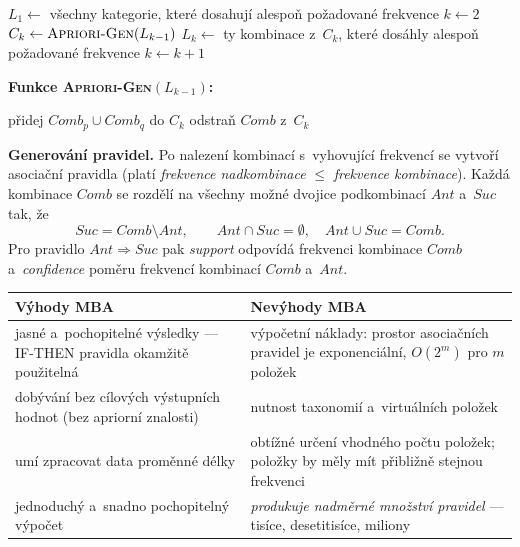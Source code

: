 \documentclass[11pt,a4paper]{article}
\theoremstyle{definition}
\begin{document}
\begin{defbox}
\begin{algorithmic}[1]
\State $L_1\gets$ všechny kategorie, které dosahují alespoň požadované frekvence
\State $k\gets 2$
  \State $C_k\gets \textsc{Apriori-Gen}(L_{k-1})$ 
  \State $L_k\gets$ ty kombinace z~$C_k$, které dosáhly alespoň požadované frekvence
  \State $k\gets k+1$
\EndWhile
\end{algorithmic}

\textbf{Funkce \textsc{Apriori-Gen}$(L_{k-1})$:}
\begin{algorithmic}[1]
     \State přidej $\mathit{Comb}_p\cup \mathit{Comb}_q$ do $C_k$ 
  \EndIf
\EndFor
{} 
     \State odstraň $\mathit{Comb}$ z~$C_k$
  \EndIf
\EndFor
\end{algorithmic}
\end{defbox}

\textbf{Generování pravidel.} Po nalezení kombinací s~vyhovující frekvencí se vytvoří
asociační pravidla (platí \emph{frekvence nadkombinace} $\le$ \emph{frekvence kombinace}).
Každá kombinace $\mathit{Comb}$ se rozdělí na všechny možné dvojice podkombinací
$\mathit{Ant}$ a~$\mathit{Suc}$ tak, že
\[ \mathit{Suc}=\mathit{Comb}\setminus \mathit{Ant},\qquad
   \mathit{Ant}\cap \mathit{Suc}=\emptyset,\quad \mathit{Ant}\cup \mathit{Suc}=\mathit{Comb}. \]
Pro pravidlo $\mathit{Ant}\Rightarrow \mathit{Suc}$ pak \emph{support} odpovídá frekvenci
kombinace $\mathit{Comb}$ a~\emph{confidence} poměru frekvencí kombinací $\mathit{Comb}$
a~$\mathit{Ant}$.

\begin{center}
\small
\begin{tabular}{@{}p{7.6cm}p{8.0cm}@{}}
\toprule
\textbf{Výhody MBA} & \textbf{Nevýhody MBA} \\
\midrule
jasné a~pochopitelné výsledky --- IF-THEN pravidla okamžitě použitelná & výpočetní náklady:
  prostor asociačních pravidel je exponenciální, $O(2^m)$ pro $m$ položek \\
dobývání bez cílových výstupních hodnot (bez apriorní znalosti) & nutnost taxonomií
  a~virtuálních položek \\
umí zpracovat data proměnné délky & obtížné určení vhodného počtu položek; položky by měly
  mít přibližně stejnou frekvenci \\
jednoduchý a~snadno pochopitelný výpočet & \emph{produkuje nadměrné množství pravidel} ---
  tisíce, desetitisíce, miliony \\
\bottomrule
\end{tabular}
\end{center}
\end{document}
